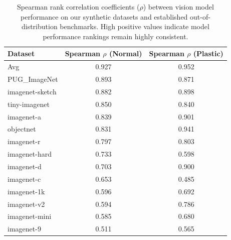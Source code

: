 \begin{table}[h]
\centering
\small
\begin{tabular}{lcc}
\toprule
\textbf{Dataset} & \textbf{Spearman $\rho$ (Normal)} & \textbf{Spearman $\rho$ (Plastic)} \\
\midrule
Avg & 0.927 & 0.952 \\
PUG\_ImageNet & 0.893 & 0.871 \\
imagenet-sketch & 0.882 & 0.898 \\
tiny-imagenet & 0.850 & 0.840 \\
imagenet-a & 0.839 & 0.901 \\
objectnet & 0.831 & 0.941 \\
imagenet-r & 0.797 & 0.803 \\
imagenet-hard & 0.733 & 0.598 \\
imagenet-d & 0.703 & 0.900 \\
imagenet-c & 0.653 & 0.485 \\
imagenet-1k & 0.596 & 0.692 \\
imagenet-v2 & 0.594 & 0.786 \\
imagenet-mini & 0.585 & 0.680 \\
imagenet-9 & 0.511 & 0.565 \\
\bottomrule
\end{tabular}
\caption{Spearman rank correlation coefficients ($\rho$) between vision model performance on our synthetic datasets and established out-of-distribution benchmarks. High positive values indicate model performance rankings remain highly consistent.}
\label{tab:spearman_rank_correlations}
\end{table}
